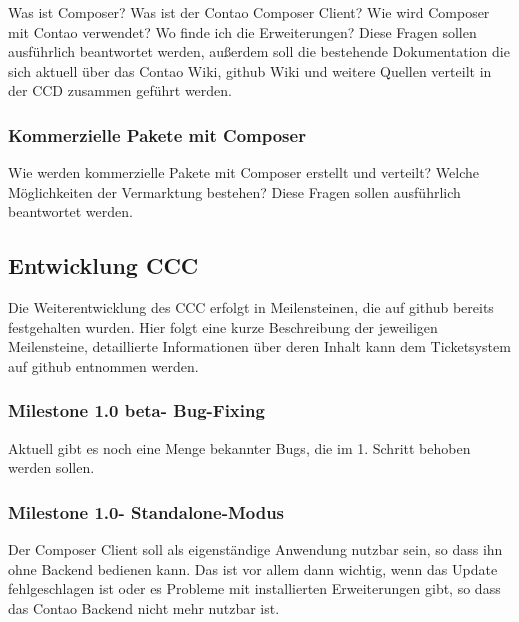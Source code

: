 \documentclass[
paper=a4,
draft=false,%
fontsize=10pt%
]{scrartcl}
\begin{document}
Was ist Composer? Was ist der Contao Composer Client? Wie wird Composer mit Contao verwendet? Wo finde ich die Erweiterungen?
Diese Fragen sollen ausführlich beantwortet werden, außerdem soll die bestehende Dokumentation die sich aktuell über das Contao Wiki, github Wiki und weitere Quellen verteilt in der CCD zusammen geführt werden.

\subsubsection{Kommerzielle Pakete mit Composer}

Wie werden kommerzielle Pakete mit Composer erstellt und verteilt? Welche Möglichkeiten der Vermarktung bestehen? Diese Fragen sollen ausführlich beantwortet werden.

\pagebreak

\subsection{Entwicklung CCC}
\label{subsec:ccc}

Die Weiterentwicklung des CCC erfolgt in Meilensteinen, die auf github bereits festgehalten wurden. Hier folgt eine kurze Beschreibung der jeweiligen Meilensteine, detaillierte Informationen über deren Inhalt kann dem Ticketsystem auf github entnommen werden.

\subsubsection[Milestone 1.0 beta - Bug-Fixing]{Milestone 1.0 beta\footnotemark - Bug-Fixing}
\label{subsec:ccc-milestone-1.0-beta}

Aktuell gibt es noch eine Menge bekannter Bugs, die im 1. Schritt behoben werden sollen.

\subsubsection[Milestone 1.0 - Standalone-Modus]{Milestone 1.0\footnotemark - Standalone-Modus}
\label{subsec:ccc-milestone-1.0}

Der Composer Client soll als eigenständige Anwendung nutzbar sein, so dass ihn ohne Backend bedienen kann. Das ist vor allem dann wichtig, wenn das Update fehlgeschlagen ist oder es Probleme mit installierten Erweiterungen gibt, so dass das Contao Backend nicht mehr nutzbar ist.
\end{document}
